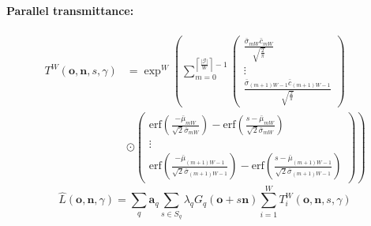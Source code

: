 \documentclass[a4paper, 11pt]{memoir}
\newcommand*{\erf}{\text{erf}}
\begin{document}
    \paragraph{Parallel \gls{transmittance}:}
    \label{par:parallel_transmittance}
    \begin{equation}
        \begin{aligned}
            T^W(\mathbf{o}, \mathbf{n}, s, \gamma) &= \exp^W\left( \sum_{m = 0}^{\left\lceil \frac{|\mathcal{G}|}{W} \right\rceil - 1}
            \begin{pmatrix}
                \frac{\bar{\sigma}_{mW}\bar{c}_{mW}}{\sqrt{\frac{2}{\pi}}} \\ \vdots \\\frac{\bar{\sigma}_{(m+1)W-1}\bar{c}_{(m+1)W-1}}{\sqrt{\frac{2}{\pi}}} 
            \end{pmatrix} \right.\\&\left.\odot \begin{pmatrix}
                \erf{\left( \frac{- \bar{\mu}_{mW}}{\sqrt{2}\bar{\sigma}_{mW}} \right) - \erf{\left( \frac{s - \bar{\mu}_{mW}}{\sqrt{2}\bar{\sigma}_{mW}} \right)}} \\
                \vdots \\
               \erf{\left( \frac{- \bar{\mu}_{(m+1)W - 1}}{\sqrt{2}\bar{\sigma}_{(m+1)W - 1}} \right) - \erf{\left( \frac{s - \bar{\mu}_{(m+1)W - 1}}{\sqrt{2}\bar{\sigma}_{(m+1)W - 1}} \right)}} 
            \end{pmatrix}\right)
        \end{aligned}
    \end{equation}
    \begin{equation}
        \hat{L}(\mathbf{o}, \mathbf{n}, \gamma) = \sum_{q} \mathbf{a}_q \sum_{s \in S_q} \lambda_qG_q(\mathbf{o} + s\mathbf{n})\sum_{i = 1}^W T^W_i(\mathbf{o}, \mathbf{n}, s, \gamma)
    \end{equation}
\end{document}

